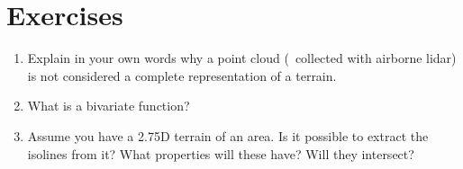 %
\section{Exercises}

\begin{enumerate}
  \item Explain in your own words why a point cloud (\eg\ collected with airborne lidar) is not considered a complete representation of a terrain.
  \item What is a bivariate function? 
  \item Assume you have a 2.75D terrain of an area. Is it possible to extract the isolines from it? What properties will these have? Will they intersect?
\end{enumerate}
